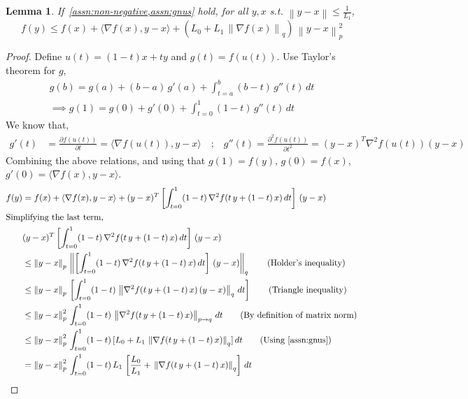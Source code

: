 \documentclass{article}
\newtheorem{lemma}{Lemma}
\newcommand{\normsq}[1]{\left\|#1 \right\|^{2}}
\newcommand{\norm}[1]{\left\|#1 \right\|}
\begin{document}
\begin{lemma}
If~\cref{assn:non-negative,assn:gnus} hold, for all $y, x$ s.t. $\norm{y - x} \leq \frac{1}{L_1}$, 
\[
f(y) \leq f(x) + \langle \nabla f(x), y - x \rangle + \left(L_0+ L_1 \, \norm{\nabla f(x)}_q \right) \, \normsq{y - x}_p
\] 
\label{lemma:descent-ineq-gnus}
\end{lemma}
\begin{proof}
Define $u(t) = (1-t) x + t y$ and $g(t) = f(u(t))$. Use Taylor's theorem for $g$,
\begin{align*}
g(b) = g(a) + (b - a) \, g'(a) + \int_{t = a}^{b} (b - t) \, g''(t) \, dt \\
\implies g(1) = g(0) + g'(0) + \int_{t = 0}^{1} (1 - t) \, g''(t) \, dt \tag{Substituting $a = 0$ and $b = 1$} 
\end{align*}
We know that, 
\begin{align*}
g'(t) &= \frac{\partial f(u(t))}{\partial t} = \langle \nabla f(u(t)), y - x \rangle \quad \text{;} \quad g''(t) = \frac{\partial^2 f(u(t))}{\partial t^2} = (y - x)^T \nabla^2 f(u(t))  (y - x)
\end{align*}
Combining the above relations, and using that $g(1) = f(y)$, $g(0) = f(x)$, $g'(0)  = \langle \nabla f(x), y - x \rangle$. 
\begin{align*}
f(y) &= f(x) + \langle \nabla f(x), y - x \rangle + (y-x)^T \left[\int_{t = 0}^{1} (1-t) \, \nabla^2 f(t \, y + (1-t) \, x) \, dt \right]\, (y-x) \\
\intertext{Simplifying the last term,}
& (y-x)^T \left[\int_{t = 0}^{1} (1-t) \, \nabla^2 f(t \, y + (1-t) \, x) \, dt \right]\, (y-x) \\
&\leq \norm{y - x}_p \, \norm{\left[\int_{t = 0}^{1} (1-t) \, \nabla^2 f(t \, y + (1-t) \, x) \, dt \right]\, (y-x)}_{q} \tag{Holder's inequality} \\
& \leq \norm{y - x}_p \, \left[\int_{t = 0}^{1} (1-t) \, \norm{\nabla^2 f(t \, y + (1-t) \, x) \, (y-x)}_{q} \, dt \right] \tag{Triangle inequality} \\
& \leq \normsq{y - x}_p \,  \int_{t = 0}^{1} (1-t) \, \norm{\nabla^2 f(t \, y + (1-t) \, x)}_{p \to q} \, dt \tag{By definition of matrix norm} \\
& \leq \normsq{y - x}_p \,  \int_{t = 0}^{1} (1-t) \, [L_0 + L_1 \, \norm{\nabla f(t \, y + (1-t) \, x)}_q] \, dt \tag{Using~\cref{assn:gnus}} \\
& = \normsq{y - x}_p \,  \int_{t = 0}^{1} (1-t) \, L_1 \, \left [\frac{L_0}{L_1} + \, \norm{\nabla f(t \, y + (1-t) \, x)}_q\right] \, dt\\

\end{align*}
\end{proof}
\end{document}
